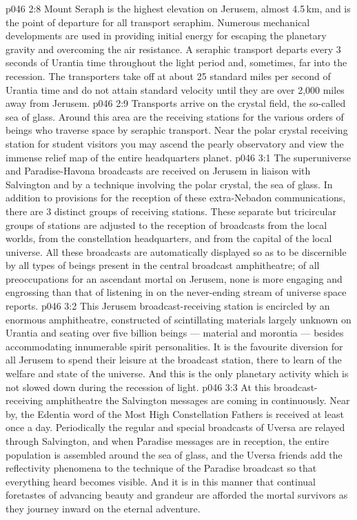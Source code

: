 \vs p046 2:8 \pc Mount Seraph is the highest elevation on Jerusem, almost 4.5\,km, and is the point of departure for all transport seraphim. Numerous mechanical developments are used in providing initial energy for escaping the planetary gravity and overcoming the air resistance. A seraphic transport departs every 3 seconds of Urantia time throughout the light period and, sometimes, far into the recession. The transporters take off at about 25 standard miles per second of Urantia time and do not attain standard velocity until they are over 2,000 miles away from Jerusem.
\vs p046 2:9 Transports arrive on the crystal field, the so\hyp{}called sea of glass. Around this area are the receiving stations for the various orders of beings who traverse space by seraphic transport. Near the polar crystal receiving station for student visitors you may ascend the pearly observatory and view the immense relief map of the entire headquarters planet.
\vs p046 3:1 The superuniverse and Paradise\hyp{}Havona broadcasts are received on Jerusem in liaison with Salvington and by a technique involving the polar crystal, the sea of glass. In addition to provisions for the reception of these extra\hyp{}Nebadon communications, there are 3 distinct groups of receiving stations. These separate but tricircular groups of stations are adjusted to the reception of broadcasts from the local worlds, from the constellation headquarters, and from the capital of the local universe. All these broadcasts are automatically displayed so as to be discernible by all types of beings present in the central broadcast amphitheatre; of all preoccupations for an ascendant mortal on Jerusem, none is more engaging and engrossing than that of listening in on the never\hyp{}ending stream of universe space reports.
\vs p046 3:2 This Jerusem broadcast\hyp{}receiving station is encircled by an enormous amphitheatre, constructed of scintillating materials largely unknown on Urantia and seating over five billion beings --- material and morontia --- besides accommodating innumerable spirit personalities. It is the favourite diversion for all Jerusem to spend their leisure at the broadcast station, there to learn of the welfare and state of the universe. And this is the only planetary activity which is not slowed down during the recession of light.
\vs p046 3:3 At this broadcast\hyp{}receiving amphitheatre the Salvington messages are coming in continuously. Near by, the Edentia word of the Most High Constellation Fathers is received at least once a day. Periodically the regular and special broadcasts of Uversa are relayed through Salvington, and when Paradise messages are in reception, the entire population is assembled around the sea of glass, and the Uversa friends add the reflectivity phenomena to the technique of the Paradise broadcast so that everything heard becomes visible. And it is in this manner that continual foretastes of advancing beauty and grandeur are afforded the mortal survivors as they journey inward on the eternal adventure.
